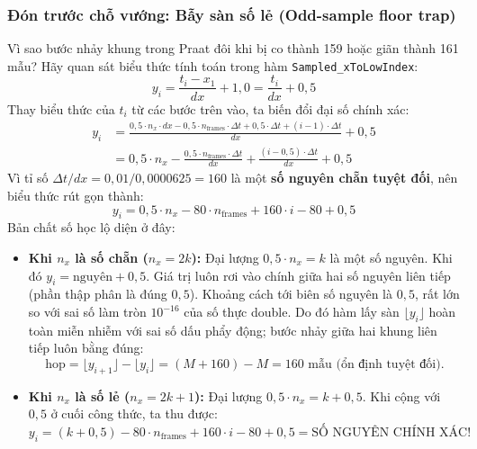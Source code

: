 \subsubsection*{Đón trước chỗ vướng: Bẫy sàn số lẻ (Odd-sample floor trap)}
\begin{thoughtqa}{Vì sao bước nhảy khung trong Praat đôi khi bị co thành 159 hoặc giãn thành 161 mẫu?}
Hãy quan sát biểu thức tính toán trong hàm \texttt{Sampled\_xToLowIndex}:
\begin{equation}
y_i = \frac{t_i - x_1}{dx} + 1{,}0 = \frac{t_i}{dx} + 0{,}5
\end{equation}
Thay biểu thức của $t_i$ từ các bước trên vào, ta biến đổi đại số chính xác:
\begin{align}
y_i &= \frac{0{,}5 \cdot n_x \cdot dx - 0{,}5 \cdot n_{\text{frames}} \cdot \Delta t + 0{,}5 \cdot \Delta t + (i - 1) \cdot \Delta t}{dx} + 0{,}5 \nonumber \\
    &= 0{,}5 \cdot n_x - \frac{0{,}5 \cdot n_{\text{frames}} \cdot \Delta t}{dx} + \frac{(i - 0{,}5) \cdot \Delta t}{dx} + 0{,}5
\end{align}
Vì tỉ số $\Delta t / dx = 0{,}01 / 0{,}0000625 = 160$ là một \textbf{số nguyên chẵn tuyệt đối}, nên biểu thức rút gọn thành:
\begin{equation}
y_i = 0{,}5 \cdot n_x - 80 \cdot n_{\text{frames}} + 160 \cdot i - 80 + 0{,}5
\end{equation}
Bản chất số học lộ diện ở đây:
\begin{itemize}[leftmargin=1.5em, itemsep=2pt]
    \item \textbf{Khi $n_x$ là số chẵn ($n_x = 2k$):} Đại lượng $0{,}5 \cdot n_x = k$ là một số nguyên. Khi đó $y_i = \text{nguyên} + 0{,}5$. Giá trị luôn rơi vào chính giữa hai số nguyên liên tiếp (phần thập phân là đúng $0{,}5$). Khoảng cách tới biên số nguyên là $0{,}5$, rất lớn so với sai số làm tròn $10^{-16}$ của số thực double. Do đó hàm lấy sàn $\lfloor y_i \rfloor$ hoàn toàn miễn nhiễm với sai số dấu phẩy động; bước nhảy giữa hai khung liên tiếp luôn bằng đúng:
    \begin{equation}
    \text{hop} = \lfloor y_{i+1} \rfloor - \lfloor y_i \rfloor = (M + 160) - M = 160\text{ mẫu (ổn định tuyệt đối)}.
    \end{equation}
    \item \textbf{Khi $n_x$ là số lẻ ($n_x = 2k + 1$):} Đại lượng $0{,}5 \cdot n_x = k + 0{,}5$. Khi cộng với $0{,}5$ ở cuối công thức, ta thu được:
    \begin{equation}
    y_i = (k + 0{,}5) - 80 \cdot n_{\text{frames}} + 160 \cdot i - 80 + 0{,}5 = \text{SỐ NGUYÊN CHÍNH XÁC}!

\end{equation}
\end{itemize}
\end{thoughtqa}
